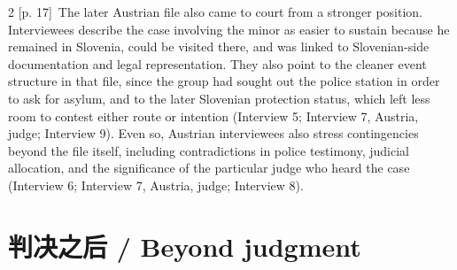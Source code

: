 \documentclass[10pt,a4paper]{article}
\begin{document}
\begin{paracol}{2}
{\scriptsize\color{gray} [p. 17]}\ The later Austrian file also came to court from a stronger position. Interviewees describe the case involving the minor as easier to sustain because he remained in Slovenia, could be visited there, and was linked to Slovenian-side documentation and legal representation. They also point to the cleaner event structure in that file, since the group had sought out the police station in order to ask for asylum, and to the later Slovenian protection status, which left less room to contest either route or intention (Interview 5; Interview 7, Austria, judge; Interview 9). Even so, Austrian interviewees also stress contingencies beyond the file itself, including contradictions in police testimony, judicial allocation, and the significance of the particular judge who heard the case (Interview 6; Interview 7, Austria, judge; Interview 8).\par
\switchcolumn*
\end{paracol}
\section*{判决之后 / Beyond judgment}
\end{document}
